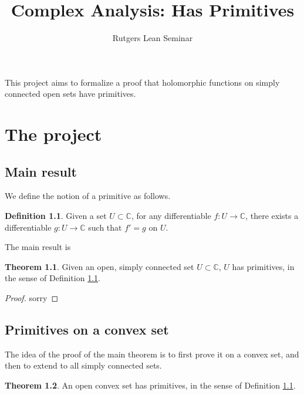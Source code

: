 \documentclass{report}
\title{Complex Analysis: Has Primitives}
\author{Rutgers Lean Seminar}
\theoremstyle{definition}
\newtheorem{definition}{Definition}
\newtheorem{theorem}{Theorem}
\begin{document}
\maketitle

This project aims to formalize a proof that holomorphic functions on simply connected open sets have primitives.

\chapter{The project}

\section{Main result}


We define the notion of a primitive as follows.

\begin{definition}
  \label{hasPrimitives}
  \leanok
  Given a set $U\subset\mathbb C$, for any differentiable $f:U\to\mathbb C$, there exists a differentiable $g:U\to\mathbb C$ such that $f'=g$ on $U$.
\end{definition}

The main result is

\begin{theorem}
  \label{hasPrimitivesOfSimplyConnected}
  \leanok
  Given an open, simply connected set $U\subset\mathbb C$, $U$ has primitives, in the sense of Definition \ref{hasPrimitives}.
\end{theorem}

\begin{proof}
  sorry
\end{proof}

\section{Primitives on a convex set}
The idea of the proof of the main theorem is to first prove it on a convex set, and then to extend to all simply connected sets.

\begin{theorem}
  \label{hasPrimitivesOfConvex}
  \leanok
  An open convex set has primitives, in the sense of Definition \ref{hasPrimitives}.
\end{theorem}
\end{document}
